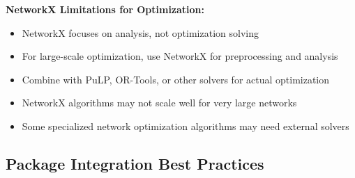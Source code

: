 \begin{warn}
\textbf{NetworkX Limitations for Optimization:}
\begin{itemize}
\item NetworkX focuses on analysis, not optimization solving
\item For large-scale optimization, use NetworkX for preprocessing and analysis
\item Combine with PuLP, OR-Tools, or other solvers for actual optimization
\item NetworkX algorithms may not scale well for very large networks
\item Some specialized network optimization algorithms may need external solvers
\end{itemize}
\end{warn}

\subsection{Package Integration Best Practices}

